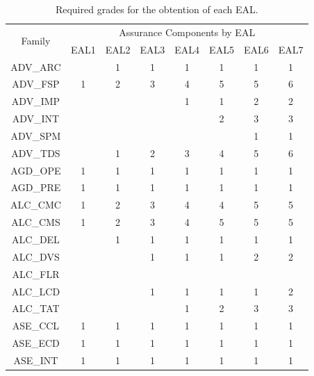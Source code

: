 \begin{table}[]
\centering
\caption{Required grades for the obtention of each EAL.}
\label{tab:components}
\begin{tabular}{|c|c|c|c|c|c|c|c|}
\hline
\multirow{2}{*}{Family} & \multicolumn{7}{c|}{Assurance Components by EAL} \\ \cline{2-8} 
                        & EAL1  & EAL2  & EAL3 & EAL4 & EAL5 & EAL6 & EAL7 \\
                        \midrule
ADV\_ARC                &       & 1     & 1    & 1    & 1    & 1    & 1    \\ 
ADV\_FSP                & 1     & 2     & 3    & 4    & 5    & 5    & 6    \\ 
ADV\_IMP                &       &       &      & 1    & 1    & 2    & 2    \\ 
ADV\_INT                &       &       &      &      & 2    & 3    & 3    \\ 
ADV\_SPM                &       &       &      &      &      & 1    & 1    \\ 
ADV\_TDS                &       & 1     & 2    & 3    & 4    & 5    & 6    \\
\midrule
AGD\_OPE                & 1     & 1     & 1    & 1    & 1    & 1    & 1    \\ 
AGD\_PRE                & 1     & 1     & 1    & 1    & 1    & 1    & 1    \\ 
\midrule
ALC\_CMC                & 1     & 2     & 3    & 4    & 4    & 5    & 5    \\ 
ALC\_CMS                & 1     & 2     & 3    & 4    & 5    & 5    & 5    \\ 
ALC\_DEL                &       & 1     & 1    & 1    & 1    & 1    & 1    \\ 
ALC\_DVS                &       &       & 1    & 1    & 1    & 2    & 2    \\ 
ALC\_FLR                &       &       &      &      &      &      &      \\ 
ALC\_LCD                &       &       & 1    & 1    & 1    & 1    & 2    \\ 
ALC\_TAT                &       &       &      & 1    & 2    & 3    & 3    \\ 
\midrule
ASE\_CCL                & 1     & 1     & 1    & 1    & 1    & 1    & 1    \\ 
ASE\_ECD                & 1     & 1     & 1    & 1    & 1    & 1    & 1    \\ 
ASE\_INT                & 1     & 1     & 1    & 1    & 1    & 1    & 1    \\ 

\end{tabular}
\end{table}
